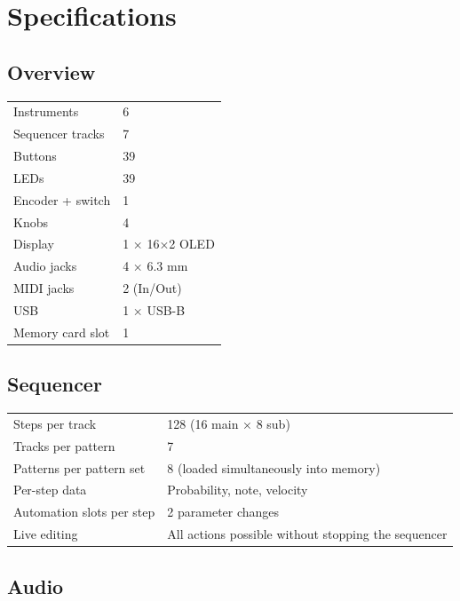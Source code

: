 \section{Specifications}\label{specifications}

\subsection{Overview}\label{overview}

{\def\LTcaptype{none} %
\begin{longtable}[]{@{}ll@{}}
\toprule\noalign{}
\endhead
\bottomrule\noalign{}
\endlastfoot
Instruments & 6 \\
Sequencer tracks & 7 \\
Buttons & 39 \\
LEDs & 39 \\
Encoder + switch & 1 \\
Knobs & 4 \\
Display & 1 × 16×2 OLED \\
Audio jacks & 4 × 6.3 mm \\
MIDI jacks & 2 (In/Out) \\
USB & 1 × USB-B \\
Memory card slot & 1 \\
\end{longtable}
}

\subsection{Sequencer}\label{sequencer}

{\def\LTcaptype{none} %
\begin{longtable}[]{@{}ll@{}}
\toprule\noalign{}
\endhead
\bottomrule\noalign{}
\endlastfoot
Steps per track & 128 (16 main × 8 sub) \\
Tracks per pattern & 7 \\
Patterns per pattern set & 8 (loaded simultaneously into memory) \\
Per-step data & Probability, note, velocity \\
Automation slots per step & 2 parameter changes \\
Live editing & All actions possible without stopping the sequencer \\
\end{longtable}
}

\subsection{Audio}\label{audio}

